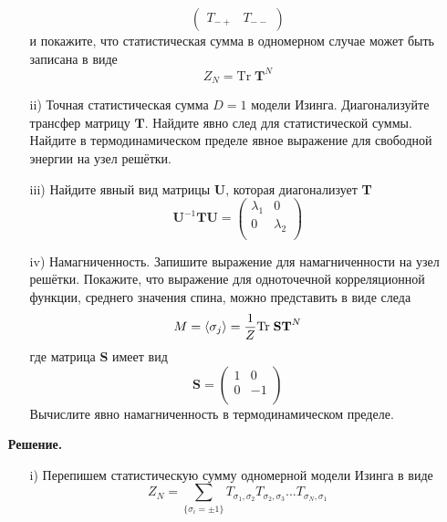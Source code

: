 \documentclass[12pt]{article}
\theoremstyle{definition}
\begin{document}
\begin{enumerate}
\begin{itemize}
\begin{equation}
\begin{pmatrix}
            T_{-+} & T_{--}
            \end{pmatrix}
        \end{equation}
        и покажите, что статистическая сумма в одномерном случае может быть записана в виде
        \begin{equation}
            Z_N=\text{Tr}\;\textbf{T}^N
        \end{equation}
        \item[ii)] Точная статистическая сумма $D=1$ модели Изинга. Диагонализуйте трансфер матрицу $\textbf{T}$. Найдите явно след для статистической суммы. Найдите в термодинамическом пределе явное выражение для свободной энергии на узел решётки.
        \item[iii)] Найдите явный вид матрицы \textbf{U}, которая диагонализует \textbf{T}
        \begin{equation}
            \textbf{U}^{-1}\textbf{T}\textbf{U}=\begin{pmatrix}
            \lambda_1 & 0\\
            0 & \lambda_2\\
            \end{pmatrix}
        \end{equation}
        \item[iv)] Намагниченность. Запишите выражение для намагниченности на узел решётки. Покажите, что выражение для одноточечной корреляционной функции, среднего значения спина, можно представить в виде следа
        \begin{equation}
            M=\braket{\sigma_j}=\frac{1}{Z}\text{Tr}\;\textbf{S}\textbf{T}^N
        \end{equation}
        где матрица \textbf{S} имеет вид
        \begin{equation}
            \textbf{S}=\begin{pmatrix}
            1 & 0\\
            0 & -1\\
            \end{pmatrix}
        \end{equation}
        Вычислите явно намагниченность в термодинамическом пределе.
    \end{itemize}
    \textbf{Решение.}
    \begin{itemize}
        \item[i)] Перепишем статистическую сумму одномерной модели Изинга в виде
        \begin{equation}
            Z_N=\sum\limits_{\{\sigma_i=\pm1\}}T_{\sigma_1,\sigma_2}T_{\sigma_2,\sigma_3}...T_{\sigma_N,\sigma_1}

\end{equation}
\end{itemize}
\end{enumerate}
\end{document}

